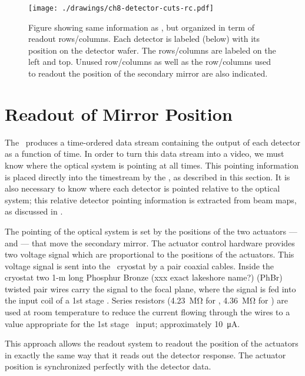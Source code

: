 \begin{figure}
\centering
\texttt{[image: ./drawings/ch8-detector-cuts-rc.pdf]}
\caption{Figure showing same information as , but organized in term of readout rows/columns. Each detector is labeled (below) with its position on the detector wafer. The rows/columns are labeled on the left and top. Unused row/columns as well as the row/columns used to readout the position of the secondary mirror are also indicated. }
\label{fig:detector-cuts-rc}
\end{figure}


\section{Readout of Mirror Position}\label{s:mirror-readout}

The \Imager\ produces a time-ordered data stream containing the output of each detector as a function of time.
In order to turn this data stream into a video, we must know where the optical system is pointing at all times.
This pointing information is placed directly into the timestream by the \Imager, as described in this section.
It is also necessary to know where each detector is pointed relative to the optical system; this relative detector pointing information is extracted from beam maps, as discussed in .

The pointing of the optical system is set by the positions of the two actuators ---  and  --- that move the secondary mirror.
The actuator control hardware provides two voltage signal which are proportional to the positions of the actuators.
This voltage signal is sent into the \Imager\ cryostat by a pair coaxial cables.
Inside the cryostat two 1-m long Phosphur Bronze (xxx exact lakeshore name?) (PhBr)  twisted pair wires carry the signal to the focal plane, where the signal is fed into the input coil of a 1st stage \SQUID.
Series resistors (\SI{4.23}{\mega\ohm} for , \SI{4.36}{\mega\ohm} for ) are used at room temperature to reduce the current flowing through the wires to a value appropriate for the 1st stage \SQUID\ input; approximately \SI{10}{\uA}.

This approach allows the readout system to readout the position of the actuators in exactly the same way that it reads out the detector response.
The actuator position is synchronized perfectly with the detector data.

